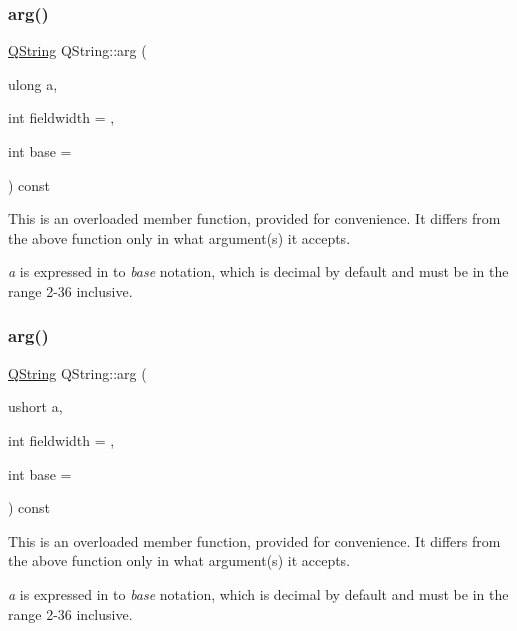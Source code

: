 \subsubsection{\texorpdfstring{arg()}{arg()}\hspace{0.1cm}{\footnotesize\ttfamily [9/10]}}
{\footnotesize\ttfamily \mbox{\hyperlink{class_q_string}{Q\+String}} Q\+String\+::arg (\begin{DoxyParamCaption}\item[{ulong}]{a,  }\item[{int}]{fieldwidth = {},  }\item[{int}]{base = {} }\end{DoxyParamCaption}) const}

This is an overloaded member function, provided for convenience. It differs from the above function only in what argument(s) it accepts.

{\itshape a} is expressed in to {\itshape base} notation, which is decimal by default and must be in the range 2-\/36 inclusive. \mbox{\label{class_q_string_aac4ae5c7abbd2646418249eaea3dc53b}} 
\subsubsection{\texorpdfstring{arg()}{arg()}\hspace{0.1cm}{\footnotesize\ttfamily [10/10]}}
{\footnotesize\ttfamily \mbox{\hyperlink{class_q_string}{Q\+String}} Q\+String\+::arg (\begin{DoxyParamCaption}\item[{ushort}]{a,  }\item[{int}]{fieldwidth = {},  }\item[{int}]{base = {} }\end{DoxyParamCaption}) const\hspace{0.3cm}{\ttfamily [inline]}}

This is an overloaded member function, provided for convenience. It differs from the above function only in what argument(s) it accepts.

{\itshape a} is expressed in to {\itshape base} notation, which is decimal by default and must be in the range 2-\/36 inclusive. \mbox{\label{class_q_string_aa86d59b310f60f4b0178f46eb6cb64d2}} 
